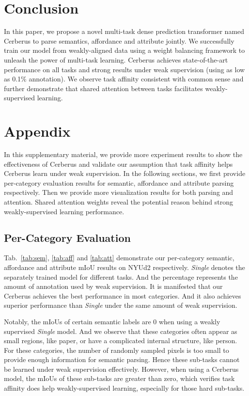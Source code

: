 \documentclass[10pt,twocolumn,letterpaper]{article}
\begin{document}
\section{Conclusion}
In this paper, we propose a novel multi-task dense prediction transformer named Cerberus to parse semantics, affordance and attribute jointly. We successfully train our model from weakly-aligned data using a weight balancing framework to unleash the power of multi-task learning. Cerberus achieves state-of-the-art performance on all tasks and strong results under weak supervision (using as low as 0.1\% annotation). We observe task affinity consistent with common sense and further demonstrate that shared attention between tasks facilitates weakly-supervised learning. 


{\small


}

\newpage

\section{Appendix}

In this supplementary material, we provide more experiment results to show the effectiveness of Cerberus and validate our assumption that task affinity helps Cerberus learn under weak supervision. In the following sections, we first provide per-category evaluation results for semantic, affordance and attribute parsing respectively. Then we provide more visualization results for both parsing and attention. Shared attention weights reveal the potential reason behind strong weakly-supervised learning performance.

\subsection{Per-Category Evaluation}
Tab.~\ref{tab:sem}, \ref{tab:aff} and \ref{tab:att} demonstrate our per-category semantic, affordance and attribute mIoU results on NYUd2\cite{silberman2012indoor} respectively. \emph{Single} denotes the separately trained model for different tasks. And the percentage represents the amount of annotation used by weak supervision. It is manifested that our Cerberus achieves the best performance in most categories. And it also achieves superior performance than \emph{Single} under the same amount of weak supervision.

Notably, the mIoUs of certain semantic labels are 0 when using a weakly supervised \emph{Single} model. And we observe that these categories often appear as small regions, like paper, or have a complicated internal structure, like person. For these categories, the number of randomly sampled pixels is too small to provide enough information for semantic parsing. Hence these sub-tasks cannot be learned under weak supervision effectively. However, when using a Cerberus model, the mIoUs of these sub-tasks are greater than zero, which verifies task affinity does help weakly-supervised learning, especially for those hard sub-tasks.
\end{document}
